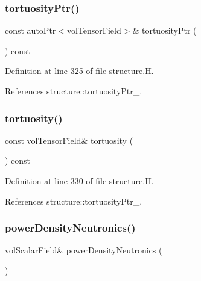 \subsubsection{\texorpdfstring{tortuosity\+Ptr()}{tortuosityPtr()}}
{\footnotesize\ttfamily const auto\+Ptr$<$vol\+Tensor\+Field$>$\& tortuosity\+Ptr (\begin{DoxyParamCaption}{ }\end{DoxyParamCaption}) const\hspace{0.3cm}{\ttfamily [inline]}}



Definition at line 325 of file structure.\+H.



References structure\+::tortuosity\+Ptr\+\_\+.

\mbox{\label{classFoam_1_1structure_a37021dc7173903ecbaffef0cee5632c4}} 
\subsubsection{\texorpdfstring{tortuosity()}{tortuosity()}}
{\footnotesize\ttfamily const vol\+Tensor\+Field\& tortuosity (\begin{DoxyParamCaption}{ }\end{DoxyParamCaption}) const\hspace{0.3cm}{\ttfamily [inline]}}



Definition at line 330 of file structure.\+H.



References structure\+::tortuosity\+Ptr\+\_\+.

\mbox{\label{classFoam_1_1structure_a2eb0a266a288909b3480c78cc83348ed}} 
\subsubsection{\texorpdfstring{power\+Density\+Neutronics()}{powerDensityNeutronics()}}
{\footnotesize\ttfamily vol\+Scalar\+Field\& power\+Density\+Neutronics (\begin{DoxyParamCaption}{ }\end{DoxyParamCaption})\hspace{0.3cm}{\ttfamily [inline]}}



